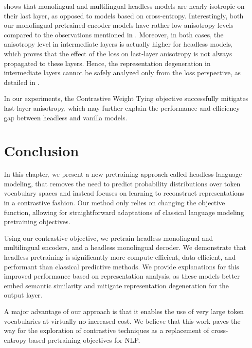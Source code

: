  shows that monolingual and multilingual headless models are nearly isotropic on their last layer, as opposed to models based on cross-entropy. Interestingly, both our monolingual pretrained encoder models have rather low anisotropy levels compared to the observations mentioned in . Moreover, in both cases, the anisotropy level in intermediate layers is actually higher for headless models, which proves that the effect of the loss on last-layer anisotropy is not always propagated to these layers. Hence, the representation degeneration in intermediate layers cannot be safely analyzed only from the loss perspective, as detailed in .

In our experiments, the Contrastive Weight Tying objective successfully mitigates last-layer anisotropy, which may further explain the performance and efficiency gap between headless and vanilla models.

\section*{Conclusion}
In this chapter, we present a new pretraining approach called headless language modeling, that removes the need to predict probability distributions over token vocabulary spaces and instead focuses on learning to reconstruct representations in a contrastive fashion. Our method only relies on changing the objective function, allowing for straightforward adaptations of classical language modeling pretraining objectives.

Using our contrastive objective, we pretrain headless monolingual and multilingual encoders, and a headless monolingual decoder. We demonstrate that headless pretraining is significantly more compute-efficient, data-efficient, and performant than classical predictive methods. We provide explanations for this improved performance based on representation analysis, as these models better embed semantic similarity and mitigate representation degeneration for the output layer.

A major advantage of our approach is that it enables the use of very large token vocabularies at virtually no increased cost.
%
We believe that this work paves the way for the exploration of contrastive techniques as a replacement of cross-entropy based pretraining objectives for NLP.


% 
% 

